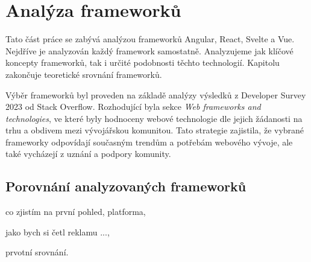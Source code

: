 \section{Analýza frameworků}

Tato část práce se zabývá analýzou frameworků Angular, React, Svelte a Vue. Nejdříve je analyzován každý framework samostatně. 
Analyzujeme jak klíčové koncepty frameworků, tak i určité podobnosti těchto technologií. Kapitolu zakončuje teoretické srovnání frameworků.

Výběr frameworků byl proveden na základě analýzy výsledků z Developer Survey 2023 od Stack Overflow. 
Rozhodující byla sekce \textit{Web frameworks and technologies}, ve které byly hodnoceny webové technologie dle jejich žádanosti na trhu a obdivem mezi vývojářskou komunitou. 
Tato strategie zajistila, že vybrané frameworky odpovídají současným trendům a potřebám webového vývoje, ale také vycházejí z uznání a podpory komunity.\cite{stackoverflow, developersurvey}







\subsection{Porovnání analyzovaných frameworků}


\begin{citemize}
	\item co zjistím na první pohled, platforma,
	\item jako bych si četl reklamu ...,
	\item prvotní srovnání.
\end{citemize}
